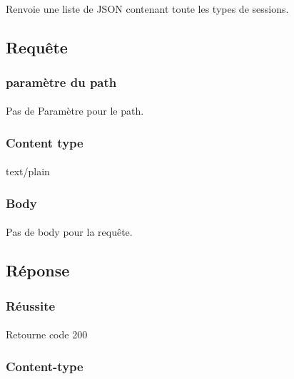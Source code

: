 \paragraph{}
	Renvoie une liste de JSON contenant toute les types de sessions.

\subsection{Requête}
	\subsubsection{paramètre du path}
		\paragraph{}
			Pas de Paramètre pour le path.
	
	\subsubsection{Content type}
		\paragraph{}
			text/plain
			
	\subsubsection{Body}
		\paragraph{}
			Pas de body pour la requête.

\vspace{\baselineskip}
\subsection{Réponse}
	\subsubsection{Réussite}
		\paragraph{}
			Retourne code 200
			
	\subsubsection{Content-type}
